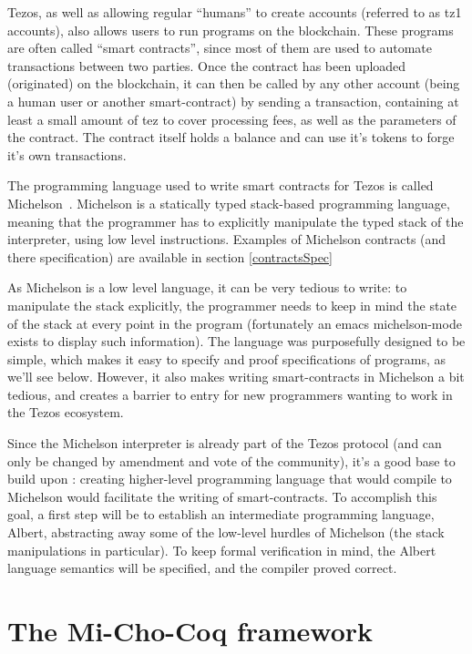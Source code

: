 \documentclass{report}
\begin{document}
Tezos, as well as allowing regular ``humans'' to create accounts (referred to as tz1 accounts), also allows users to run programs on the blockchain. These programs are often called ``smart contracts'', since most of them are used to automate transactions between two parties. Once the contract has been uploaded (originated) on the blockchain, it can then be called by any other account (being a human user or another smart-contract) by sending a transaction, containing at least a small amount of tez to cover processing fees, as well as the parameters of the contract. The contract itself holds a balance and can use it's tokens to forge it's own transactions.

The programming language used to write smart contracts for Tezos is called Michelson~\cite{michelsonwhitedoc}. Michelson is a statically typed stack-based programming language, meaning that the programmer has to explicitly manipulate the typed stack of the interpreter, using low level instructions. Examples of Michelson contracts (and there specification) are available in section \ref{contractsSpec}

As Michelson is a low level language, it can be very tedious to write: to manipulate the stack explicitly, the programmer needs to keep in mind the state of the stack at every point in the program (fortunately an emacs michelson-mode exists to display such information). The language was purposefully designed to be simple, which makes it easy to specify and proof specifications of programs, as we'll see below. However, it also makes writing smart-contracts in Michelson a bit tedious, and creates a barrier to entry for new programmers wanting to work in the Tezos ecosystem.

Since the Michelson interpreter is already part of the Tezos protocol (and can only be changed by amendment and vote of the community), it's a good base to build upon : creating higher-level programming language that would compile to Michelson would facilitate the writing of smart-contracts. To accomplish this goal, a first step will be to establish an intermediate programming language, Albert, abstracting away some of the low-level hurdles of Michelson (the stack manipulations in particular). To keep formal verification in mind, the Albert language semantics will be specified, and the compiler proved correct.

\chapter{The Mi-Cho-Coq framework}
\end{document}
